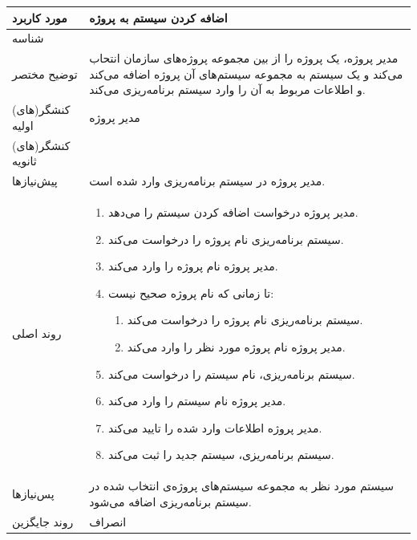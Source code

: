 \begin{table}[H]
	\centering
	\begin{tabular}{|p{3cm}|p{10cm}|}
		\hline
		
		
		مورد کاربرد	& اضافه کردن سیستم به پروژه  \\
		\hline
		
		شناسه & 
		\stepcounter{usecase_ID}
		
		\arabic{usecase_ID} \\
		
		\hline
		
		توضیح مختصر & مدیر پروژه، یک پروژه را از بین مجموعه پروژه‌های سازمان انتحاب می‌کند و یک سیستم به مجموعه سیستم‌های آن پروژه اضافه می‌کند و اطلاعات مربوط به آن را وارد سیستم برنامه‌ریزی می‌کند. \\
		\hline
		
		کنشگر(های) اولیه & مدیر پروژه \\
		\hline
		
		کنشگر(های) ثانویه&  \\
		\hline
		
		پیش‌نیازها &
		مدیر پروژه در سیستم برنامه‌ریزی وارد شده است.\\
		\hline
		
		
		روند اصلی &
		\begin{enumerate}[topsep=0cm,leftmargin=0.5cm]
			\item مدیر پروژه درخواست اضافه کردن سیستم را می‌دهد.
			\item  سیستم برنامه‌ریزی نام پروژه را درخواست می‌کند.
			\item مدیر پروژه نام پروژه را وارد می‌کند.
			\item تا زمانی که نام پروژه صحیح نیست:
			\begin{enumerate}[topsep=0cm, leftmargin=0.5cm]
				\item سیستم برنامه‌ریزی نام پروژه را درخواست می‌کند.
				\item مدیر پروژه نام پروژه‌ مورد نظر را وارد می‌کند.
			\end{enumerate}
			\item  سیستم برنامه‌ریزی، نام سیستم را درخواست می‌کند.
			\item مدیر پروژه نام سیستم را وارد می‌کند.
			\item  مدیر پروژه اطلاعات وارد شده را تایید می‌کند.
			\item سیستم برنامه‌ریزی، سیستم جدید را ثبت می‌کند.
		\end{enumerate} \\
		
		\hline
		
		پس‌نیازها &
		سیستم مورد نظر به مجموعه سیستم‌های پروژه‌ی انتخاب شده در سیستم برنامه‌ریزی اضافه می‌شود. \\
		\hline
		
		روند جایگزین & انصراف \\
		\hline
		
	\end{tabular}
\end{table}


